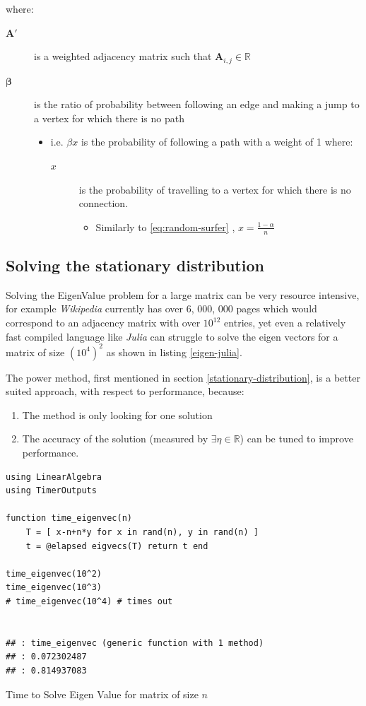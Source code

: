 \documentclass[11pt]{article}
\begin{document}
where:

\begin{description}
\item[{\(\mathbf{A'}\)}] is a weighted adjacency matrix such that \(\mathbf{A}_{i, j} \in \mathbb{R}\)
\item[{\(\mathbf{\beta}\)}] is the ratio of probability between following an edge and
making a jump to a vertex for which there is no path
\begin{itemize}
\item i.e. \(\beta x\) is the probability of following a path with a weight of 1 where:
\begin{description}
\item[{\(x\)}] is the probability of travelling to a vertex for which there is no connection.
\begin{itemize}
\item Similarly to \eqref{eq:random-surfer} , \(x = \frac{1-\alpha}{n}\)
\end{itemize}
\end{description}
\end{itemize}
\end{description}

\subsection{Solving the stationary distribution}
\label{iterative-power-method}
Solving the EigenValue problem for a large matrix can be very resource
intensive, for example \emph{Wikipedia} currently has over 6, 000, 000 pages
\cite{WikipediaSizeWikipedia2020} which would correspond to an adjacency matrix
with over \(10^{12}\) entries, yet even a relatively fast compiled language like
\emph{Julia} can struggle to solve the eigen vectors for a matrix of size
\((10^{4})^{2}\) as shown in listing \ref{eigen-julia}.

The power method, first mentioned in section \ref{stationary-distribution}, is a
better suited approach, with respect to performance, because:

\begin{enumerate}
\item The method is only looking for one solution
\item The accuracy of the solution (measured by  \(\exists\eta\in \mathbb{R}\)) can be tuned to improve performance.
\end{enumerate}



\begin{listing}[htbp]
\begin{verbatim}
using LinearAlgebra
using TimerOutputs

function time_eigenvec(n)
    T = [ x-n+n*y for x in rand(n), y in rand(n) ]
    t = @elapsed eigvecs(T) return t end

time_eigenvec(10^2)
time_eigenvec(10^3)
# time_eigenvec(10^4) # times out


## : time_eigenvec (generic function with 1 method)
## : 0.072302487
## : 0.814937083
\end{verbatim}
\caption{\label{eigen-julia}Time to Solve Eigen Value for matrix of size \(n\)}
\end{listing}
\end{document}
